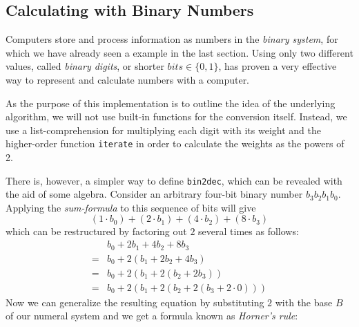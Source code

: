 \subsection{Calculating with Binary Numbers}

Computers store and process information as numbers in the \emph{binary system}, for which we have already seen a example in the last section.
Using only two different values, called \emph{binary digits}, or shorter $bits \in \{0,1\}$, has
proven a very effective way to represent and calculate numbers with a computer.

\begin{impl}
As the purpose of this implementation is to outline the idea of the underlying algorithm, we will not use built-in functions for the conversion itself.
Instead, we use a list-comprehension for multiplying each digit with its weight and the higher-order function \texttt{iterate} in order to calculate the weights as the powers of 2.
\end{impl}


There is, however, a simpler way to define \texttt{bin2dec}, which can be revealed with the aid of some algebra.
Consider an arbitrary four-bit binary number $b_3b_2b_1b_0$.
Applying the \emph{sum-formula} to this sequence of bits will give
\begin{equation*}
(1 \cdot b_0) + (2 \cdot b_1) + (4 \cdot b_2) + (8 \cdot b_3)
\end{equation*}
which can be restructured by factoring out $2$ several times as follows:
\begin{align*}
&b_0+2b_1+4b_2+8b_3 \\
=&b_0+2(b_1+2b_2+4b_3) \\
=&b_0+2(b_1+2(b_2+2b_3)) \\
=&b_0+2(b_1+2(b_2+2(b_3+2 \cdot 0)))
\end{align*}
Now we can generalize the resulting equation by substituting $2$ with the base $B$ of our numeral system and we get a formula known as \emph{Horner's rule}:

